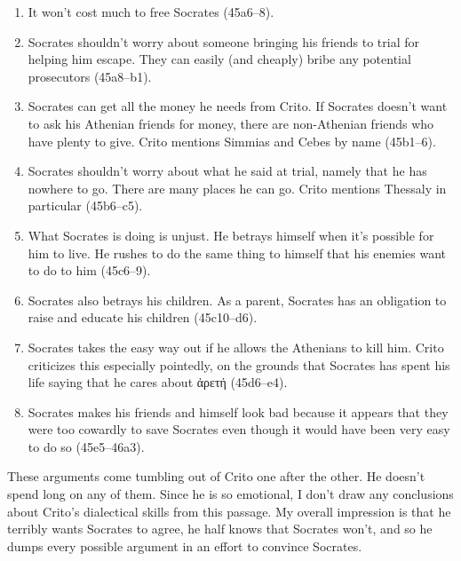\documentclass[12pt,letterpaper]{article}
\begin{document}
\begin{enumerate}

    \item It won't cost much to free Socrates (45a6--8).

    \item Socrates shouldn't worry about someone bringing his friends to trial for helping him escape.
        They can easily (and cheaply) bribe any potential prosecutors (45a8--b1).

    \item Socrates can get all the money he needs from Crito.
        If Socrates doesn't want to ask his Athenian friends for money, there are non-Athenian friends who have plenty to give.
        Crito mentions Simmias and Cebes by name (45b1--6).

    \item Socrates shouldn't worry about what he said at trial, namely that he has nowhere to go.
        There are many places he can go.
        Crito mentions Thessaly in particular (45b6--c5).

    \item What Socrates is doing is unjust.
        He betrays himself when it's possible for him to live.
        He rushes to do the same thing to himself that his enemies want to do to him (45c6--9).

    \item Socrates also betrays his children.
        As a parent, Socrates has an obligation to raise and educate his children (45c10--d6).

    \item Socrates takes the easy way out if he allows the Athenians to kill him.
        Crito criticizes this especially pointedly, on the grounds that Socrates has spent his life saying that he cares about \textgreek{ἀρετή} (45d6--e4).

    \item Socrates makes his friends and himself look bad because it appears that they were too cowardly to save Socrates even though it would have been very easy to do so (45e5--46a3).

\end{enumerate}

These arguments come tumbling out of Crito one after the other.
He doesn't spend long on any of them.
Since he is so emotional, I don't draw any conclusions about Crito's dialectical skills from this passage.
My overall impression is that he terribly wants Socrates to agree, he half knows that Socrates won't, and so he dumps every possible argument in an effort to convince Socrates.
\end{document}
